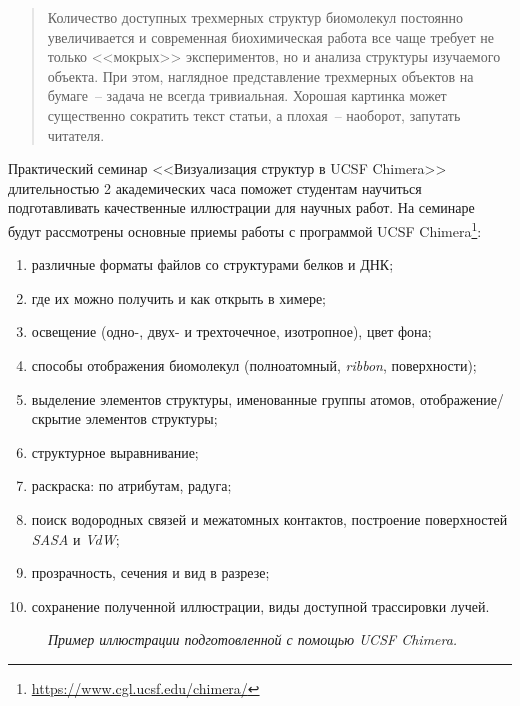 \begin{abstract}
Количество доступных трехмерных структур биомолекул постоянно увеличивается и современная биохимическая работа все чаще требует не только <<мокрых>> экспериментов, но и анализа структуры изучаемого объекта. При этом, наглядное представление трехмерных объектов на бумаге~-- задача не всегда тривиальная. Хорошая картинка может существенно сократить текст статьи, а плохая~-- наоборот, запутать читателя. 
\end{abstract}

Практический семинар <<Визуализация структур в UCSF Chimera>> длительностью 2 академических часа поможет студентам научиться подготавливать качественные иллюстрации для научных работ. На семинаре будут рассмотрены основные приемы работы с программой UCSF Chimera\footnote{\url{https://www.cgl.ucsf.edu/chimera/}}:
\begin{enumerate}
    \item различные форматы файлов со структурами белков и ДНК; %
    \item где их можно получить и как открыть в химере; %
    \item освещение (одно-, двух- и трехточечное, изотропное), цвет фона; %
    \item способы отображения биомолекул (полноатомный, \textit{ribbon}, поверхности); %
    \item выделение элементов структуры, именованные группы атомов, отображение/скрытие элементов структуры; %
    \item структурное выравнивание; %
    \item раскраска: по атрибутам, радуга; %
    \item поиск водородных связей и межатомных контактов, построение поверхностей \textit{SASA} и \textit{VdW};
    \item прозрачность, сечения и вид в разрезе;
    \item сохранение полученной иллюстрации, виды доступной трассировки лучей.
\end{enumerate}
\hfill
\begin{figure}[h!]
  \caption{\textit{Пример иллюстрации подготовленной с помощью UCSF Chimera.}}
  \label{fig:smug}
\end{figure}